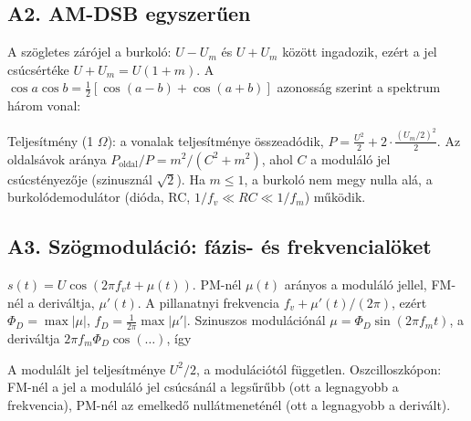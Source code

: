 \subsection{\texorpdfstring{A2. AM-DSB egyszerűen}{A2. AM-DSB egyszerűen}}\label{a5-am}
\begin{center}\end{center}

A szögletes zárójel a burkoló: $U-U_m$ és $U+U_m$ között ingadozik, ezért a jel csúcsértéke $U+U_m=U(1+m)$. A $\cos a\cos b=\tfrac12[\cos(a-b)+\cos(a+b)]$ azonosság szerint a spektrum három vonal:

\begin{center}\end{center}

Teljesítmény (1 $\Omega$): a vonalak teljesítménye összeadódik, $P=\frac{U^2}2+2\cdot\frac{(U_m/2)^2}{2}$. Az oldalsávok aránya $P_\text{oldal}/P=m^2/(C^2+m^2)$, ahol $C$ a moduláló jel csúcstényezője (szinusznál $\sqrt2$). Ha $m\le1$, a burkoló nem megy nulla alá, a burkolódemodulátor (dióda, RC, $1/f_v\ll RC\ll1/f_m$) működik.

\subsection{\texorpdfstring{A3. Szögmoduláció: fázis- és frekvencialöket}{A3. Szögmoduláció: fázis- és frekvencialöket}}\label{a5-fm}
$s(t)=U\cos(2\pi f_vt+\mu(t))$. PM-nél $\mu(t)$ arányos a moduláló jellel, FM-nél a deriváltja, $\mu'(t)$. A pillanatnyi frekvencia $f_v+\mu'(t)/(2\pi)$, ezért $\Phi_D=\max|\mu|$, $f_D=\frac{1}{2\pi}\max|\mu'|$. Szinuszos modulációnál $\mu=\Phi_D\sin(2\pi f_mt)$, a deriváltja $2\pi f_m\Phi_D\cos(\ldots)$, így

\begin{center}\end{center}

A modulált jel teljesítménye $U^2/2$, a modulációtól független. Oszcilloszkópon: FM-nél a jel a moduláló jel csúcsánál a legsűrűbb (ott a legnagyobb a frekvencia), PM-nél az emelkedő nullátmeneténél (ott a legnagyobb a derivált).

